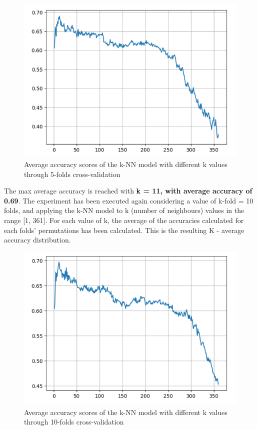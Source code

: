 \documentclass[11pt,a4paper]{article}
\begin{document}
\begin{figure}
    \centering
    \includegraphics[width=1\linewidth]{ICS-5110-Fig-08.png}
    \caption{Average accuracy scores of the k-NN model with different k values through 5-folds cross-validation}
    \label{fig:Average accuracy scores of the k-NN model with different k values 5-fold}
\end{figure}
The max average accuracy is reached with \textbf{k = 11, with average accuracy of 0.69}.
The experiment has been executed again considering a value of k-fold = 10 folds, and applying the k-NN model to k (number of neighbours) values in the range [1, 361]. For each value of k, the average of the accuracies calculated for each folds’ permutations has been calculated. This is the resulting K - average accuracy distribution.
\begin{figure}
    \centering
    \includegraphics[width=1\linewidth]{ICS-5110-Fig-09.png}
    \caption{ Average accuracy scores of the k-NN model with different k values through 10-folds cross-validation }
    \label{fig:Average accuracy scores of the k-NN model with different k values 10-fold}
\end{figure}
\end{document}
